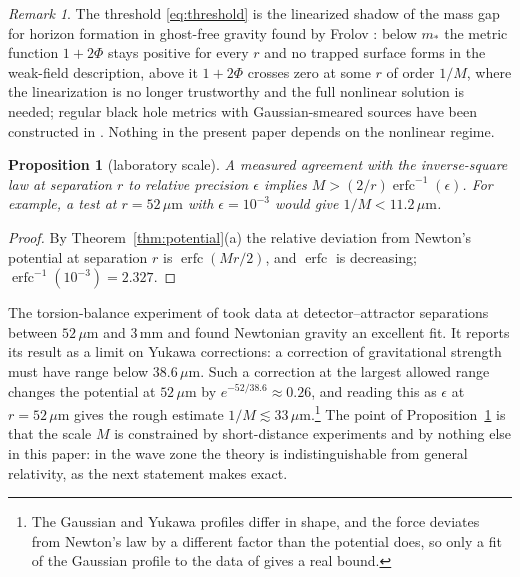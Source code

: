 \documentclass[aps,prd,10pt,twocolumn,superscriptaddress,nofootinbib,floatfix,longbibliography,showpacs,showkeys]{revtex4-2}
\theoremstyle{plain}
\newtheorem{proposition}{Proposition}
\theoremstyle{definition}
\theoremstyle{remark}
\newtheorem{remark}{Remark}
\newcommand{\erfc}{\operatorname{erfc}}
\begin{document}
\begin{remark}
The threshold \eqref{eq:threshold} is the linearized shadow of the mass gap for horizon formation in ghost-free gravity found by Frolov \cite{Frolov2015}: below $m_*$ the metric function $1+2\Phi$ stays positive for every $r$ and no trapped surface forms in the weak-field description, above it $1+2\Phi$ crosses zero at some $r$ of order $1/M$, where the linearization is no longer trustworthy and the full nonlinear solution is needed; regular black hole metrics with Gaussian-smeared sources have been constructed in \cite{NicoliniSmailagicSpallucci2006,ModestoMoffatNicolini2011}. Nothing in the present paper depends on the nonlinear regime.
\end{remark}

\begin{proposition}[laboratory scale]
\label{prop:lab}
A measured agreement with the inverse-square law at separation $r$ to relative precision $\epsilon$ implies $M>(2/r)\erfc^{-1}(\epsilon)$. For example, a test at $r=52\,\mu\mathrm m$ with $\epsilon=10^{-3}$ would give $1/M<11.2\,\mu\mathrm m$.
\end{proposition}

\begin{proof}
By Theorem~\ref{thm:potential}(a) the relative deviation from Newton's potential at separation $r$ is $\erfc(Mr/2)$, and $\erfc$ is decreasing; $\erfc^{-1}(10^{-3})=2.327$.
\end{proof}

The torsion-balance experiment of \cite{Lee2020} took data at detector--attractor separations between $52\,\mu\mathrm m$ and $3\,\mathrm{mm}$ and found Newtonian gravity an excellent fit. It reports its result as a limit on Yukawa corrections: a correction of gravitational strength must have range below $38.6\,\mu\mathrm m$. Such a correction at the largest allowed range changes the potential at $52\,\mu\mathrm m$ by $e^{-52/38.6}\approx0.26$, and reading this as $\epsilon$ at $r=52\,\mu\mathrm m$ gives the rough estimate $1/M\lesssim33\,\mu\mathrm m$.\footnote{The Gaussian and Yukawa profiles differ in shape, and the force deviates from Newton's law by a different factor than the potential does, so only a fit of the Gaussian profile to the data of \cite{Lee2020} gives a real bound.} The point of Proposition~\ref{prop:lab} is that the scale $M$ is constrained by short-distance experiments and by nothing else in this paper: in the wave zone the theory is indistinguishable from general relativity, as the next statement makes exact.
\end{document}
